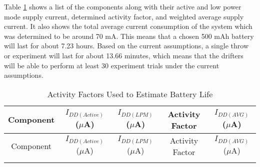 Table \ref{tab:batLife} shows a list of the components along with their active and low power mode supply current, determined activity factor, and weighted average supply current.  It also shows the total average current consumption of the system which was determined to be  around 70 mA.  This means that a chosen 500 mAh battery will last for about 7.23 hours.  Based on the current assumptions, a single throw or experiment will last for about 13.66 minutes, which means that the drifters will be able to perform at least 30 experiment trials under the current assumptions.
\begin{center}
 \begin{longtable}{|c|c|c|c|c|}
    \caption{Activity Factors Used to Estimate Battery Life  \label{tab:batLife}} \\
     \hline
    \rowcolor{Gray}
    Component & $I_{DD(Active)}$ ($\mu$A) & $I_{DD(LPM)}$ ($\mu$A) & Activity Factor & $I_{DD(AVG)}$ ($\mu$A) \\
    \hline \hline \endfirsthead
    
         \hline
   \rowcolor{Gray}
    Component & $I_{DD(Active)}$ ($\mu$A) & $I_{DD(LPM)}$ ($\mu$A) & Activity Factor & $I_{DD(AVG)}$ ($\mu$A) \\
    \hline \hline \endhead
    
    \endfoot


\end{longtable}
\end{center}
